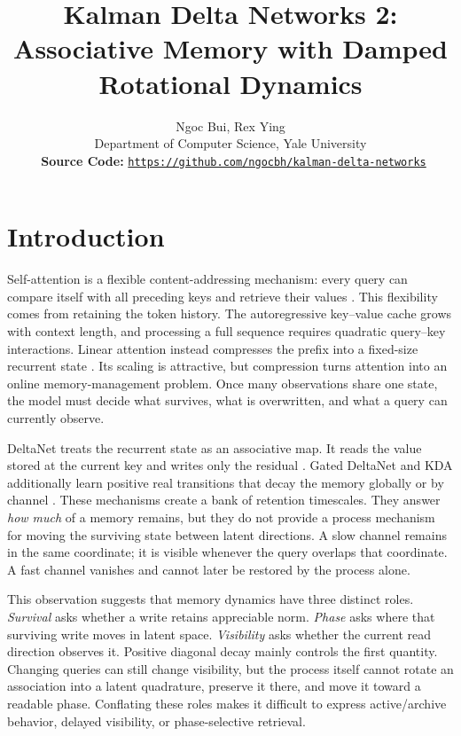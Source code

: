 \documentclass[11pt,letterpaper,logo]{yalearxiv}
\title{Kalman Delta Networks 2:\\
Associative Memory with Damped Rotational Dynamics}
\author{Ngoc Bui\yale, Rex Ying\yale\\
\yale Department of Computer Science, Yale University\\
\faGithub~\textbf{Source Code:} \href{https://github.com/ngocbh/kalman-delta-networks}{\texttt{https://github.com/ngocbh/kalman-delta-networks}}
}
\begin{document}
\maketitle


\section{Introduction}
\label{sec:intro-kdn2}

Self-attention is a flexible content-addressing mechanism: every query can compare itself with all
preceding keys and retrieve their values \citep{vaswani2017attention}. This flexibility comes from
retaining the token history. The autoregressive key--value cache grows with context length, and
processing a full sequence requires quadratic query--key interactions. Linear attention instead
compresses the prefix into a fixed-size recurrent state
\citep{katharopoulos2020transformers}. Its scaling is attractive, but compression turns attention
into an online memory-management problem. Once many observations share one state, the model must
decide what survives, what is overwritten, and what a query can currently observe.

DeltaNet treats the recurrent state as an associative map. It reads the value stored at the
current key and writes only the residual
\citep{schlag2021linear,yang2024parallelizing}. Gated DeltaNet and KDA additionally learn positive
real transitions that decay the memory globally or by channel
\citep{yang2024gdn,kimiteam2025kimilinear}. These mechanisms create a bank of retention
timescales. They answer \emph{how much} of a memory remains, but they do not provide a process
mechanism for moving the surviving state between latent directions. A slow channel remains in the
same coordinate; it is visible whenever the query overlaps that coordinate. A fast channel
vanishes and cannot later be restored by the process alone.

This observation suggests that memory dynamics have three distinct roles. \emph{Survival} asks
whether a write retains appreciable norm. \emph{Phase} asks where that surviving write moves in
latent space. \emph{Visibility} asks whether the current read direction observes it. Positive
diagonal decay mainly controls the first quantity. Changing queries can still change visibility,
but the process itself cannot rotate an association into a latent quadrature, preserve it there,
and move it toward a readable phase. Conflating these roles makes it difficult to express
active/archive behavior, delayed visibility, or phase-selective retrieval.
\end{document}
